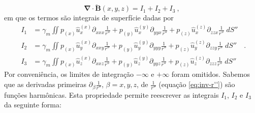 \begin{equation}
\mathbf{\nabla} \cdot \breve{\mathbf{B}}(x, y, z) = I_{1} + I_{2} + I_{3} \: ,
\label{eq:divergent-layer}
\end{equation}
em que os termos são integrais de superfície dadas por
\begin{equation*}
\begin{split}
I_{1} &= \gamma_{m} \iint
p_{(x)} \hat{u}^{(x)}_{x} \partial_{xxx} \frac{1}{r''} +
p_{(y)} \hat{u}^{(y)}_{x} \partial_{yyx} \frac{1}{r''} +
p_{(z)} \hat{u}^{(z)}_{x} \partial_{zzx} \frac{1}{r''} \; dS'' \\
I_{2} &= \gamma_{m} \iint
p_{(x)} \hat{u}^{(x)}_{y} \partial_{xxy} \frac{1}{r''} +
p_{(y)} \hat{u}^{(y)}_{y} \partial_{yyy} \frac{1}{r''} +
p_{(z)} \hat{u}^{(z)}_{y} \partial_{zzy} \frac{1}{r''} \; dS'' \\
I_{3} &= \gamma_{m} \iint
p_{(x)} \hat{u}^{(x)}_{z} \partial_{xxz} \frac{1}{r''} +
p_{(y)} \hat{u}^{(y)}_{z} \partial_{yyz} \frac{1}{r''} +
p_{(z)} \hat{u}^{(z)}_{z} \partial_{zzz} \frac{1}{r''} \; dS''
\end{split} \:\: .
\end{equation*}
Por conveniência, os limites de integração $-\infty$ e $+\infty$ foram omitidos.
Sabemos que as derivadas primeiras $\partial_{\beta} \frac{1}{r''}$, $\beta = x, y, z$, de $\frac{1}{r''}$ (equação \ref{eq:inv-r''}) são funções harmônicas. Esta propriedade permite reescrever as integrais $I_{1}$, $I_{2}$ e $I_{3}$ da seguinte forma:

